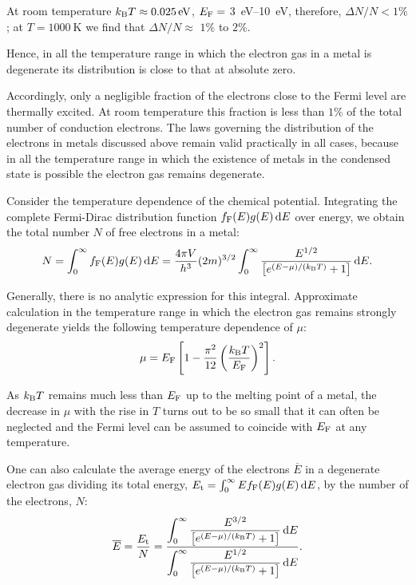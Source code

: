 \noindent
At room temperature $k_{\text{B}}T\approx\SI{0.025}{\electronvolt}$, $E_{\text{F}}=$ \SIrange{3}{10}{\electronvolt}, therefore, $\Delta{N}/{N}<1\%$; at $T=\SI{1000}{\kelvin}$ we find that $\Delta{N}/{N}\approx$ $1\%$ to $2\%$.

Hence, in all the temperature range in which the electron gas in a metal is degenerate its distribution is close to that at absolute zero.

Accordingly, only a negligible fraction of the electrons close to the Fermi level are thermally excited. At room temperature this fraction is less than $1\%$ of the total number of conduction electrons. The laws governing the distribution of the electrons in metals discussed above remain valid practically in all cases, because in all the temperature range in which the existence of metals in the condensed state is possible the electron gas remains degenerate.

Consider the temperature dependence of the chemical potential. Integrating the complete Fermi-Dirac distribution function $f_{\text{F}}(E)g(E)\,\mathrm{d} E$ over energy, we obtain the total number $N$ of free electrons in a metal:
\begin{equation*}
    N = \int_0^{\infty} f_{\text{F}}(E)g(E)\, \mathrm{d} E = \frac{4\pi V}{h^3} (2m)^{3/2} \int_0^{\infty} \frac{E^{1/2}}{\left[e^{(E-\mu)/(k_{\text{B}}T)} + 1\right]}\, \mathrm{d} E.
\end{equation*}

Generally, there is no analytic expression for this integral. Approximate calculation in the temperature range in which the electron gas remains strongly degenerate yields the following temperature dependence of $\mu$:
\begin{equation}\label{eq:3_44}
    \mu = E_{\text{F}}\left[1 - \frac{\pi^2}{12} \left(\frac{k_{\text{B}}T}{E_{\text{F}}}\right)^2\right].
\end{equation}

As $k_{\text{B}}T$ remains much less than $E_{\text{F}}$ up to the melting point of a metal, the decrease in $\mu$ with the rise in $T$ turns out to be so small that it can often be neglected and the Fermi level can be assumed to coincide with $E_{\text{F}}$ at any temperature.

One can also calculate the average energy of the electrons $\overline{E}$ in a degenerate electron gas dividing its total energy, $E_{\text{t}}=\int_0^{\infty}Ef_{\text{F}}(E)g(E)\,\mathrm{d} E$, by the number of the electrons, $N$:
\begin{equation*}
    \overline{E} = \frac{E_{\text{t}}}{N} = \frac{\displaystyle\int_0^{\infty} \dfrac{E^{3/2}}{\left[e^{(E-\mu)/(k_{\text{B}}T)} + 1\right]}\, \mathrm{d} E}{\displaystyle\int_0^{\infty} \dfrac{E^{1/2}}{\left[e^{(E-\mu)/(k_{\text{B}}T)} + 1\right]}\, \mathrm{d} E}.
\end{equation*}

